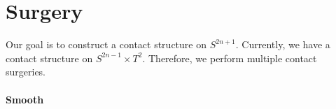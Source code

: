 \section*{Surgery}
Our goal is to construct a contact structure on $S^{2n+1}$. 
Currently, we have a contact structure on $S^{2n-1} \times T^2$.
Therefore, we perform multiple contact surgeries.

\paragraph*{Smooth}
